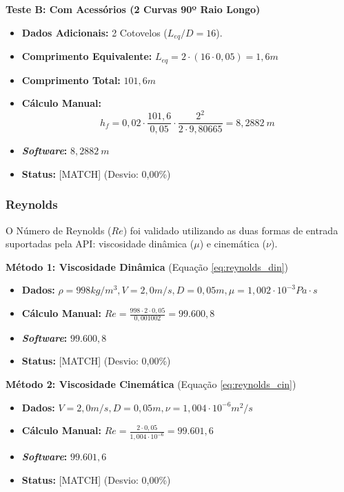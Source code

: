 \textbf{Teste B: Com Acessórios (2 Curvas 90º Raio Longo)}
\begin{itemize}
    \item \textbf{Dados Adicionais:} 2 Cotovelos ($L_{eq}/D = 16$).
    \item \textbf{Comprimento Equivalente:} $L_{eq} = 2 \cdot (16 \cdot 0,05) = 1,6 m$
    \item \textbf{Comprimento Total:} $101,6 m$
    \item \textbf{Cálculo Manual:}
    \begin{equation}
h_f = 0,02 \cdot \frac{101,6}{0,05} \cdot \frac{2^2}{2 \cdot 9,80665} = 8,2882 \ m
\label{eq:val_hf_calc_b}
\end{equation}
    \item \textbf{\textit{Software}:} $8,2882 \ m$
    \item \textbf{Status:} [MATCH] (Desvio: 0,00\%)
\end{itemize}

\subsubsection{Reynolds}
O Número de Reynolds ($Re$) foi validado utilizando as duas formas de entrada suportadas pela API: viscosidade dinâmica ($\mu$) e cinemática ($\nu$).

\textbf{Método 1: Viscosidade Dinâmica}
(Equação \ref{eq:reynolds_din})
\begin{itemize}
    \item \textbf{Dados:} $\rho=998 kg/m^3, V=2,0 m/s, D=0,05 m, \mu=1,002 \cdot 10^{-3} Pa \cdot s$
    \item \textbf{Cálculo Manual:} $Re = \frac{998 \cdot 2 \cdot 0,05}{0,001002} = 99.600,8$
    \item \textbf{\textit{Software}:} $99.600,8$
    \item \textbf{Status:} [MATCH] (Desvio: 0,00\%)
\end{itemize}

\textbf{Método 2: Viscosidade Cinemática}
(Equação \ref{eq:reynolds_cin})
\begin{itemize}
    \item \textbf{Dados:} $V=2,0 m/s, D=0,05 m, \nu=1,004 \cdot 10^{-6} m^2/s$
    \item \textbf{Cálculo Manual:} $Re = \frac{2 \cdot 0,05}{1,004 \cdot 10^{-6}} = 99.601,6$
    \item \textbf{\textit{Software}:} $99.601,6$
    \item \textbf{Status:} [MATCH] (Desvio: 0,00\%)
\end{itemize}

